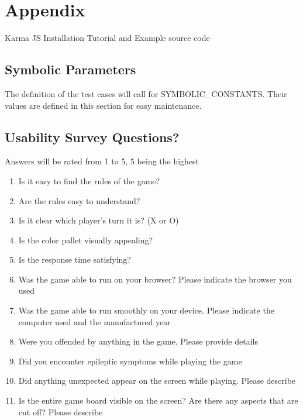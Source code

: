 \documentclass[12pt, titlepage]{article}
\begin{document}


\newpage

\section{Appendix}
Karma JS Installation Tutorial and Example source code~\citep{Karma}

\subsection{Symbolic Parameters}

The definition of the test cases will call for SYMBOLIC\_CONSTANTS.
Their values are defined in this section for easy maintenance.

\subsection{Usability Survey Questions?}
Answers will be rated from 1 to 5, 5 being the highest
\begin{enumerate}
\item
Is it easy to find the rules of the game? \label{question:q1}
\item
Are the rules easy to understand? \label{question:q2}
\item
Is it clear which player's turn it is? (X or O) \label{question:q3}
\item
Is the color pallet visually appealing? \label{question:q4}
\item
Is the response time satisfying? \label{question:q5}
\item
Was the game able to run on your browser? Please indicate the browser you used \label{question:q6}
\item
Was the game able to run smoothly on your device. Please indicate the computer used and the manufactured year \label{question:q7}
\item
Were you offended by anything in the game. Please provide details \label{question:q8}
\item
Did you encounter epileptic symptoms while playing the game \label{question:q9}
\item
Did anything unexpected appear on the screen while playing. Please describe \label{question:q10}
\item
Is the entire game board visible on the screen? Are there any aspects that are cut off? Please describe \label{question:q11}


\end{enumerate}
\end{document}
